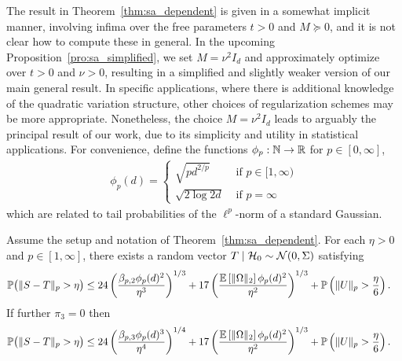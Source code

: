 The result in Theorem~\ref{thm:sa_dependent} is given in a somewhat implicit
manner, involving infima over the free parameters $t > 0$ and $M \succeq 0$,
and it is not clear how to compute these in general. In the upcoming
Proposition~\ref{pro:sa_simplified}, we set $M = \nu^2 I_d$ and approximately
optimize over $t > 0$ and $\nu > 0$, resulting in a simplified and slightly
weaker version of our main general result. In specific applications, where
there is additional knowledge of the quadratic variation structure, other
choices of regularization schemes may be more appropriate. Nonetheless, the
choice $M = \nu^2 I_d$ leads to arguably the principal result of our work,
due to its simplicity and utility in statistical applications. For convenience,
define the functions $\phi_p : \mathbb{N} \to \mathbb{R}$ for $p \in [0, \infty]$,
\begin{align*}
  \phi_p(d) =
  \begin{cases}
    \sqrt{pd^{2/p} }  & \text{ if } p \in [1,\infty)\\
    \sqrt{2\log 2d}   & \text{ if } p =\infty
  \end{cases}
\end{align*}
which are related to tail probabilities
of the $\ell^p$-norm of a standard Gaussian.

\begin{proposition}%
  \label{pro:sa_simplified}

  Assume the setup and notation of Theorem~\ref{thm:sa_dependent}.
  For each $\eta > 0$ and $p \in [1,\infty]$,
  there exists a random vector $T \mid \mathcal{H}_0 \sim \mathcal{N}(0, \Sigma)$ satisfying
  \begin{align*}
    \mathbb{P}\big(\|S-T\|_p > \eta\big)
    &\leq
    24 \left(
      \frac{\beta_{p,2} \phi_p(d)^2}{\eta^3}
    \right)^{1/3}
    + 17 \left(
      \frac{\mathbb{E} \left[ \|\Omega\|_2 \right] \phi_p(d)^2}{\eta^2}
    \right)^{1/3}
    +\mathbb{P}\left(\|U\|_p>\frac{\eta}{6}\right).
  \end{align*}
  If further $\pi_3 = 0$ then
  \begin{align*}
    \mathbb{P}\big(\|S-T\|_p > \eta\big)
    &\leq
    24 \left(
      \frac{\beta_{p,3} \phi_p(d)^3}{\eta^4}
    \right)^{1/4}
    + 17 \left(
      \frac{\mathbb{E} \left[ \|\Omega\|_2 \right] \phi_p(d)^2}{\eta^2}
    \right)^{1/3}
    +\mathbb{P}\left(\|U\|_p>\frac{\eta}{6}\right).
  \end{align*}
\end{proposition}


